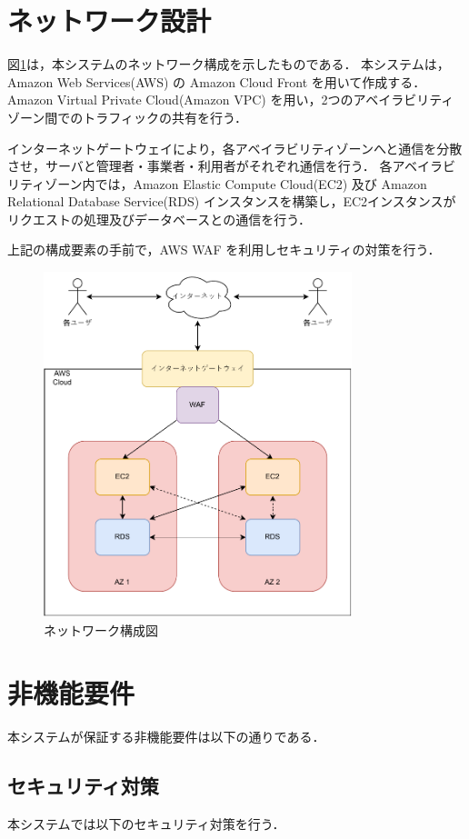 \documentclass[a4paper, titlepage]{jsarticle}
\begin{document}
\clearpage
\section{ネットワーク設計}
図\ref{fig:network}は，本システムのネットワーク構成を示したものである．
本システムは，Amazon Web Services(AWS) の Amazon Cloud Front を用いて作成する．
Amazon Virtual Private Cloud(Amazon VPC) を用い，2つのアベイラビリティゾーン間でのトラフィックの共有を行う．

インターネットゲートウェイにより，各アベイラビリティゾーンへと通信を分散させ，サーバと管理者・事業者・利用者がそれぞれ通信を行う．
各アベイラビリティゾーン内では，Amazon Elastic Compute Cloud(EC2) 及び Amazon Relational Database Service(RDS) インスタンスを構築し，EC2インスタンスがリクエストの処理及びデータベースとの通信を行う．

上記の構成要素の手前で，AWS WAF を利用しセキュリティの対策を行う．

\begin{figure}[H]
  \centering
  \includegraphics[width=0.8\textwidth]{./other/network_img.pdf}
  \caption{ネットワーク構成図}
  \label{fig:network}
\end{figure}

\section{非機能要件}
本システムが保証する非機能要件は以下の通りである．
\subsection{セキュリティ対策}
本システムでは以下のセキュリティ対策を行う．
\end{document}
